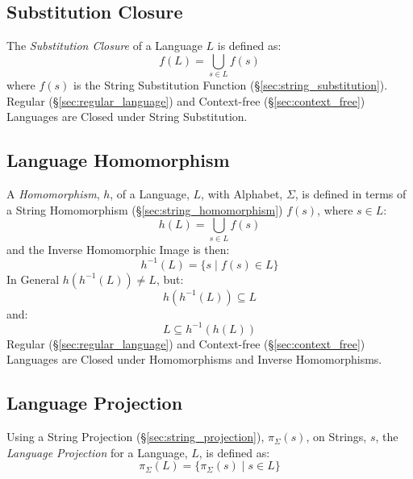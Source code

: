 \subsection{Substitution Closure}\label{sec:substitution_closure}

The \emph{Substitution Closure} of a Language $L$ is defined as:
\[
  f(L) = \bigcup_{s \in L} f(s)
\]
where $f(s)$ is the String Substitution Function
(\S\ref{sec:string_substitution}). Regular
(\S\ref{sec:regular_language}) and Context-free
(\S\ref{sec:context_free}) Languages are Closed under String
Substitution.



\subsection{Language Homomorphism}\label{sec:language_homomorphism}

A \emph{Homomorphism}, $h$, of a Language, $L$, with Alphabet,
$\Sigma$, is defined in terms of a String Homomorphism
(\S\ref{sec:string_homomorphism}) $f(s)$, where $s \in L$:
\[
  h(L) = \bigcup_{s \in L} f(s)
\]
and the Inverse Homomorphic Image is then:
\[
  h^{-1}(L) = \{ s\;|\; f(s) \in L \}
\]
In General $h(h^{-1}(L)) \neq L$, but:
\[
  h (h^{-1}(L)) \subseteq L
\] and:
\[
  L \subseteq h^{-1}(h(L))
\]
Regular (\S\ref{sec:regular_language}) and Context-free
(\S\ref{sec:context_free}) Languages are Closed under Homomorphisms
and Inverse Homomorphisms.



\subsection{Language Projection}\label{sec:language_projection}

Using a String Projection (\S\ref{sec:string_projection}),
$\pi_{\Sigma}(s)$, on Strings, $s$, the \emph{Language Projection} for
a Language, $L$, is defined as:
\[
  \pi_{\Sigma}(L) = \{\pi_{\Sigma}(s)\;|\; s \in L\}
\]



